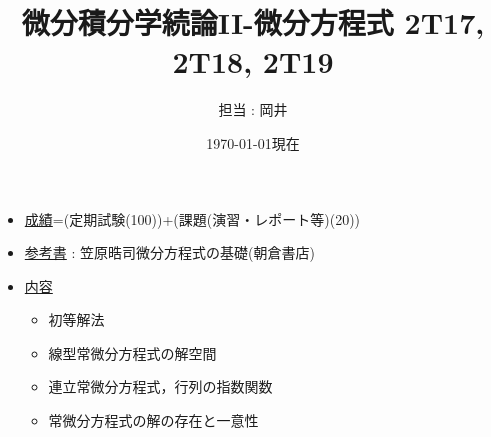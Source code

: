 \documentclass[autodetect-engine,dvipdfmx-if-dvi,ja=standard]{bxjsarticle}
\theoremstyle{mystyle1}
\theoremstyle{mystyle2}
\begin{document}
\title{微分積分学続論II-微分方程式 2T17, 2T18, 2T19}
\author{担当 : 岡井}
\date{\today 現在}
\maketitle

\begin{itemize}
  \item \underline{成績}=(定期試験(100))+(課題(演習・レポート等)(20))
  \item \underline{参考書} : 笠原晧司\quad 微分方程式の基礎(朝倉書店)
  \item \underline{内容}%
        \begin{itemize}
          \item 初等解法
          \item 線型常微分方程式の解空間
          \item 連立常微分方程式，行列の指数関数
          \item 常微分方程式の解の存在と一意性
        \end{itemize}
\end{itemize}
\hrulefill
\newpage

\tableofcontents

\newpage
\end{document}
